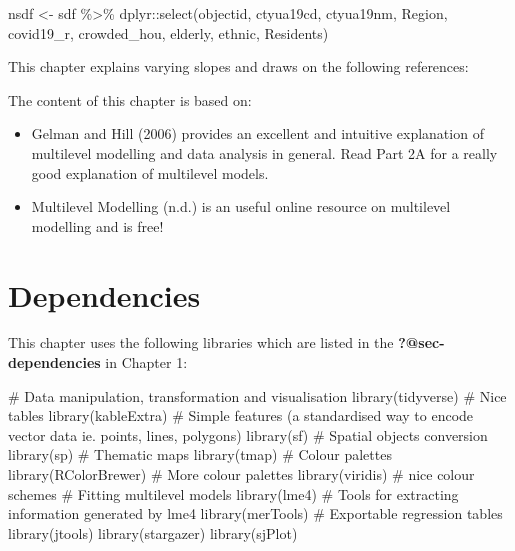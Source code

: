 \documentclass[
  letterpaper,
  krantz2]{style/krantz}
\newenvironment{Shaded}{\begin{snugshade}}{\end{snugshade}}
\newcommand{\CommentTok}[1]{\textcolor[rgb]{0.37,0.37,0.37}{#1}}
\newcommand{\FunctionTok}[1]{\textcolor[rgb]{0.28,0.35,0.67}{#1}}
\newcommand{\NormalTok}[1]{\textcolor[rgb]{0.00,0.23,0.31}{#1}}
\newcommand{\OtherTok}[1]{\textcolor[rgb]{0.00,0.23,0.31}{#1}}
\newcommand{\SpecialCharTok}[1]{\textcolor[rgb]{0.37,0.37,0.37}{#1}}
\begin{document}
\begin{Shaded}
\begin{Highlighting}[]
\NormalTok{nsdf }\OtherTok{\textless{}{-}}\NormalTok{ sdf  }\SpecialCharTok{\%\textgreater{}\%}\NormalTok{  dplyr}\SpecialCharTok{::}\FunctionTok{select}\NormalTok{(objectid, }
\NormalTok{                         ctyua19cd, }
\NormalTok{                         ctyua19nm, }
\NormalTok{                         Region, }
\NormalTok{                         covid19\_r, }
\NormalTok{                         crowded\_hou, }
\NormalTok{                         elderly, }
\NormalTok{                         ethnic, }
\NormalTok{                         Residents)}
\end{Highlighting}
\end{Shaded}

This chapter explains varying slopes and draws on the following
references:

The content of this chapter is based on:

\begin{itemize}
\item
  Gelman and Hill (2006) provides an excellent and intuitive explanation
  of multilevel modelling and data analysis in general. Read Part 2A for
  a really good explanation of multilevel models.
\item
  Multilevel Modelling (n.d.) is an useful online resource on multilevel
  modelling and is free!
\end{itemize}

\hypertarget{dependencies-5}{%
\section{Dependencies}\label{dependencies-5}}

This chapter uses the following libraries which are listed in the
\textbf{?@sec-dependencies} in Chapter 1:

\begin{Shaded}
\begin{Highlighting}[]
\CommentTok{\# Data manipulation, transformation and visualisation}
\FunctionTok{library}\NormalTok{(tidyverse)}
\CommentTok{\# Nice tables}
\FunctionTok{library}\NormalTok{(kableExtra)}
\CommentTok{\# Simple features (a standardised way to encode vector data ie. points, lines, polygons)}
\FunctionTok{library}\NormalTok{(sf) }
\CommentTok{\# Spatial objects conversion}
\FunctionTok{library}\NormalTok{(sp) }
\CommentTok{\# Thematic maps}
\FunctionTok{library}\NormalTok{(tmap) }
\CommentTok{\# Colour palettes}
\FunctionTok{library}\NormalTok{(RColorBrewer) }
\CommentTok{\# More colour palettes}
\FunctionTok{library}\NormalTok{(viridis) }\CommentTok{\# nice colour schemes}
\CommentTok{\# Fitting multilevel models}
\FunctionTok{library}\NormalTok{(lme4)}
\CommentTok{\# Tools for extracting information generated by lme4}
\FunctionTok{library}\NormalTok{(merTools)}
\CommentTok{\# Exportable regression tables}
\FunctionTok{library}\NormalTok{(jtools)}
\FunctionTok{library}\NormalTok{(stargazer)}
\FunctionTok{library}\NormalTok{(sjPlot)}
\end{Highlighting}
\end{Shaded}
\end{document}
